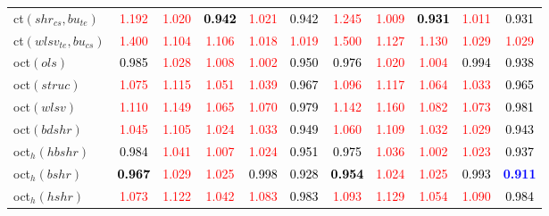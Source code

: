 \begin{tabular}[t]{l|>{}cccc>{}c|ccccc}
ct$(shr_{cs}, bu_{te})$ & \textcolor{red}{1.192} & \textcolor{red}{1.020} & \textcolor{black}{\textbf{0.942}} & \textcolor{red}{1.021} & \textcolor{black}{0.942} & \textcolor{red}{1.245} & \textcolor{red}{1.009} & \textcolor{black}{\textbf{0.931}} & \textcolor{red}{1.011} & \textcolor{black}{0.931}\\
ct$(wlsv_{te}, bu_{cs})$ & \textcolor{red}{1.400} & \textcolor{red}{1.104} & \textcolor{red}{1.106} & \textcolor{red}{1.018} & \textcolor{red}{1.019} & \textcolor{red}{1.500} & \textcolor{red}{1.127} & \textcolor{red}{1.130} & \textcolor{red}{1.029} & \textcolor{red}{1.029}\\
oct$(ols)$ & \textcolor{black}{0.985} & \textcolor{red}{1.028} & \textcolor{red}{1.008} & \textcolor{red}{1.002} & \textcolor{black}{0.950} & \textcolor{black}{0.976} & \textcolor{red}{1.020} & \textcolor{red}{1.004} & \textcolor{black}{0.994} & \textcolor{black}{0.938}\\
oct$(struc)$ & \textcolor{red}{1.075} & \textcolor{red}{1.115} & \textcolor{red}{1.051} & \textcolor{red}{1.039} & \textcolor{black}{0.967} & \textcolor{red}{1.096} & \textcolor{red}{1.117} & \textcolor{red}{1.064} & \textcolor{red}{1.033} & \textcolor{black}{0.965}\\
oct$(wlsv)$ & \textcolor{red}{1.110} & \textcolor{red}{1.149} & \textcolor{red}{1.065} & \textcolor{red}{1.070} & \textcolor{black}{0.979} & \textcolor{red}{1.142} & \textcolor{red}{1.160} & \textcolor{red}{1.082} & \textcolor{red}{1.073} & \textcolor{black}{0.981}\\
oct$(bdshr)$ & \textcolor{red}{1.045} & \textcolor{red}{1.105} & \textcolor{red}{1.024} & \textcolor{red}{1.033} & \textcolor{black}{0.949} & \textcolor{red}{1.060} & \textcolor{red}{1.109} & \textcolor{red}{1.032} & \textcolor{red}{1.029} & \textcolor{black}{0.943}\\
oct$_h(hbshr)$ & \textcolor{black}{0.984} & \textcolor{red}{1.041} & \textcolor{red}{1.007} & \textcolor{red}{1.024} & \textcolor{black}{0.951} & \textcolor{black}{0.975} & \textcolor{red}{1.036} & \textcolor{red}{1.002} & \textcolor{red}{1.023} & \textcolor{black}{0.937}\\
oct$_h(bshr)$ & \textcolor{black}{\textbf{0.967}} & \textcolor{red}{1.029} & \textcolor{red}{1.025} & \textcolor{black}{0.998} & \textcolor{black}{0.928} & \textcolor{black}{\textbf{0.954}} & \textcolor{red}{1.024} & \textcolor{red}{1.025} & \textcolor{black}{0.993} & \textcolor{blue}{\textbf{0.911}}\\
oct$_h(hshr)$ & \textcolor{red}{1.073} & \textcolor{red}{1.122} & \textcolor{red}{1.042} & \textcolor{red}{1.083} & \textcolor{black}{0.983} & \textcolor{red}{1.093} & \textcolor{red}{1.129} & \textcolor{red}{1.054} & \textcolor{red}{1.090} & \textcolor{black}{0.984}\\

\end{tabular}
